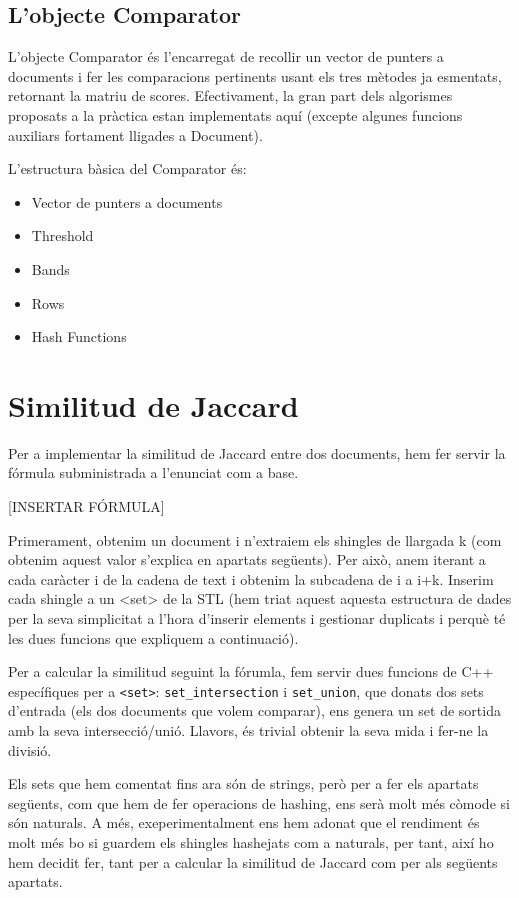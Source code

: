 \documentclass[catalan, 12pt]{report}
\begin{document}
\subsection{L'objecte Comparator}

L'objecte Comparator és l'encarregat de recollir un vector de punters a documents i fer les comparacions pertinents usant els tres mètodes ja esmentats, retornant la matriu de scores. Efectivament, la gran part dels algorismes proposats a la pràctica estan implementats aquí (excepte algunes funcions auxiliars fortament lligades a Document).

L'estructura bàsica del Comparator és:

\begin{itemize}
\item Vector de punters a documents
\item Threshold
\item Bands
\item Rows
\item Hash Functions
\end{itemize}


\section{Similitud de Jaccard}

Per a implementar la similitud de Jaccard entre dos documents, hem fer servir la fórmula subministrada a l'enunciat com a base.

[INSERTAR FÓRMULA]

Primerament, obtenim un document i n'extraiem els shingles de llargada k (com obtenim aquest valor s'explica en apartats següents). Per això, anem iterant a cada caràcter i de la cadena de text i obtenim la subcadena de i a i+k. Inserim cada shingle a un <set> de la STL (hem triat aquest aquesta estructura de dades per la seva simplicitat a l'hora d'inserir elements i gestionar duplicats i perquè té les dues funcions que expliquem a continuació).

Per a calcular la similitud seguint la fórumla, fem servir dues funcions de C++ específiques per a \verb|<set>|: \verb|set_intersection| i \verb|set_union|, que donats dos sets d'entrada (els dos documents que volem comparar), ens genera un set de sortida amb la seva intersecció/unió. Llavors, és trivial obtenir la seva mida i fer-ne la divisió.

Els sets que hem comentat fins ara són de strings, però per a fer els apartats següents, com que hem de fer operacions de hashing, ens serà molt més còmode si són naturals. A més, exeperimentalment ens hem adonat que el rendiment és molt més bo si guardem els shingles hashejats com a naturals, per tant, així ho hem decidit fer, tant per a calcular la similitud de Jaccard com per als següents apartats.
\end{document}
